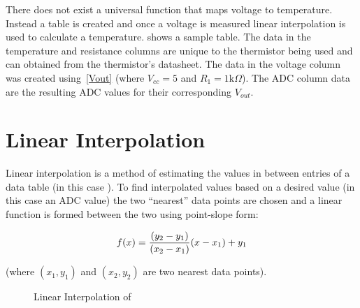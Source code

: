 \documentclass[main.tex]{subfiles}
\begin{document}
	There does not exist a universal function that maps voltage to temperature.
	Instead a table is created and once a voltage is measured linear interpolation
	is used to calculate a temperature.  shows a sample table.
	The data in the temperature and resistance columns are unique to the
	thermistor being used and can obtained from the thermistor's datasheet. The
	data in the voltage column was created using~\eqref{Vout} (where $V_{cc} = 5$
	and $R_{1} = 1\mathrm{k}\Omega$). The ADC column data are the resulting ADC values
	for their corresponding $V_{out}$.

	\begin{table}[H]
		\begin{center}
		\end{center}
	\end{table}
	
	\section{Linear Interpolation}
	\label{sec:linearInterpolation} 
	
	Linear interpolation is a method of estimating the values in between entries
	of a data table (in this case \tabref{sampleData}).  To find interpolated
	values based on a desired value (in this case an ADC value) the two
	``nearest'' data points are chosen and a linear function is formed between the
	two using point-slope form:

	\[
		f(x) = \frac{(y_{2}-y_{1})}{(x_{2}-x_{1})}(x-x_{1})+y_{1}\\
	\]

	(where $\left(x_{1},y_{1} \right)$ and $\left(x_{2},y_{2}\right)$ are two
	nearest data points). 

	
	\begin{figure}[H]
		\begin{center}
			
		\end{center}
		\caption{Linear Interpolation of~}
		\label{fig:adcTempGraph}
	\end{figure}
	
\end{document}
